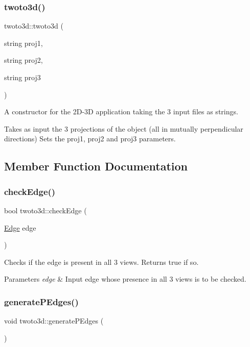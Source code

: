 \subsubsection{\texorpdfstring{twoto3d()}{twoto3d()}}
{\footnotesize\ttfamily twoto3d\+::twoto3d (\begin{DoxyParamCaption}\item[{string}]{proj1,  }\item[{string}]{proj2,  }\item[{string}]{proj3 }\end{DoxyParamCaption})}



A constructor for the 2\+D-\/3D application taking the 3 input files as strings. 

Takes as input the 3 projections of the object (all in mutually perpendicular directions) Sets the proj1, proj2 and proj3 parameters. 

\subsection{Member Function Documentation}
\mbox{\label{classtwoto3d_a7fdf12ceaffa00e9c0181ae1bcf30614}} 
\subsubsection{\texorpdfstring{check\+Edge()}{checkEdge()}}
{\footnotesize\ttfamily bool twoto3d\+::check\+Edge (\begin{DoxyParamCaption}\item[{\mbox{\hyperlink{struct_edge}{Edge}}}]{edge }\end{DoxyParamCaption})}



Checks if the edge is present in all 3 views. Returns true if so. 


\begin{DoxyParams}{Parameters}
{\em edge} & Input edge whose presence in all 3 views is to be checked. \\
\hline
\end{DoxyParams}
\mbox{\label{classtwoto3d_a602e716fedf63b73954edb1e084e4b3a}} 
\subsubsection{\texorpdfstring{generate\+P\+Edges()}{generatePEdges()}}
{\footnotesize\ttfamily void twoto3d\+::generate\+P\+Edges (\begin{DoxyParamCaption}{ }\end{DoxyParamCaption})}



